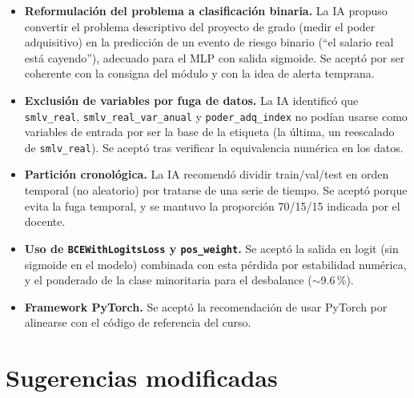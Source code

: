 \documentclass[11pt]{tg_usta}
\begin{document}
\begin{itemize}
\item \textbf{Reformulación del problema a clasificación binaria.} La IA propuso convertir el problema descriptivo del proyecto de grado (medir el poder adquisitivo) en la predicción de un evento de riesgo binario (``el salario real está cayendo''), adecuado para el MLP con salida sigmoide. Se aceptó por ser coherente con la consigna del módulo y con la idea de alerta temprana.
\item \textbf{Exclusión de variables por fuga de datos.} La IA identificó que \texttt{smlv\_real}, \texttt{smlv\_real\_var\_anual} y \texttt{poder\_adq\_index} no podían usarse como variables de entrada por ser la base de la etiqueta (la última, un reescalado de \texttt{smlv\_real}). Se aceptó tras verificar la equivalencia numérica en los datos.
\item \textbf{Partición cronológica.} La IA recomendó dividir train/val/test en orden temporal (no aleatorio) por tratarse de una serie de tiempo. Se aceptó porque evita la fuga temporal, y se mantuvo la proporción 70/15/15 indicada por el docente.
\item \textbf{Uso de \texttt{BCEWithLogitsLoss} y \texttt{pos\_weight}.} Se aceptó la salida en logit (sin sigmoide en el modelo) combinada con esta pérdida por estabilidad numérica, y el ponderado de la clase minoritaria para el desbalance ($\sim$9.6\,\%).
\item \textbf{Framework PyTorch.} Se aceptó la recomendación de usar PyTorch por alinearse con el código de referencia del curso.
\end{itemize}

\section{Sugerencias modificadas}
\end{document}

